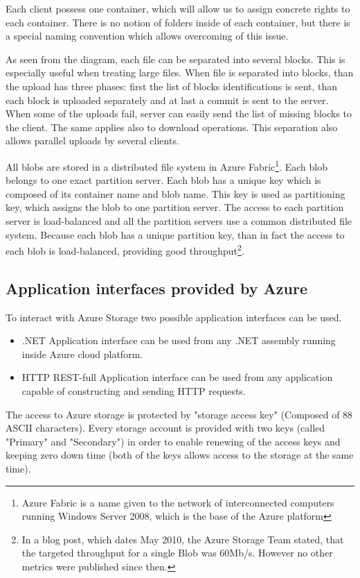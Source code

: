Each client possess one container, which will allow us to assign concrete rights to each container. There is no notion of folders inside of each container, but there is a special naming convention which allows overcoming of this issue.

As seen from the diagram, each file can be separated into several blocks. This is especially useful when treating large files. When file is separated into blocks, than the upload has three phases: first the list of blocks identifications is sent, than each block is uploaded separately and at last a commit is sent to the server. When some of the uploads fail, server can easily send the list of missing blocks to the client. The same applies also to download operations. This separation also allows parallel uploads by several clients.

All blobs are stored in a distributed file system in Azure Fabric\footnote{Azure Fabric is a name given to the network of interconnected computers running Windows Server 2008, which is the base of the Azure platform}. Each blob belongs to one exact partition server. Each blob has a unique key which is composed of its container name and blob name. This key is used as partitioning key, which assigns the blob to one partition server. The access to each partition server is load-balanced and all the partition servers use a common distributed file system. Because each blob has a unique partition key, than in fact the access to each blob is load-balanced, providing good throughput\footnote{In a blog post\cite{azureblob}, which dates May 2010, the Azure Storage Team stated, that the targeted throughput for a single Blob was 60Mb/s. However no other metrics were published since then.}.

\subsection{Application interfaces provided by Azure}
To interact with Azure Storage two possible application interfaces can be used.

\begin{itemize}
	\item .NET Application interface can be used from any .NET assembly running inside Azure cloud platform.
	\item HTTP REST-full Application interface can be used from any application capable of constructing and sending HTTP requests.
\end{itemize}

The access to Azure storage is protected by "storage access key" (Composed of 88 ASCII characters). Every storage account is provided with two keys (called "Primary" and "Secondary") in order to enable renewing of the access keys and keeping zero down time (both of the keys allows access to the storage at the same time).

